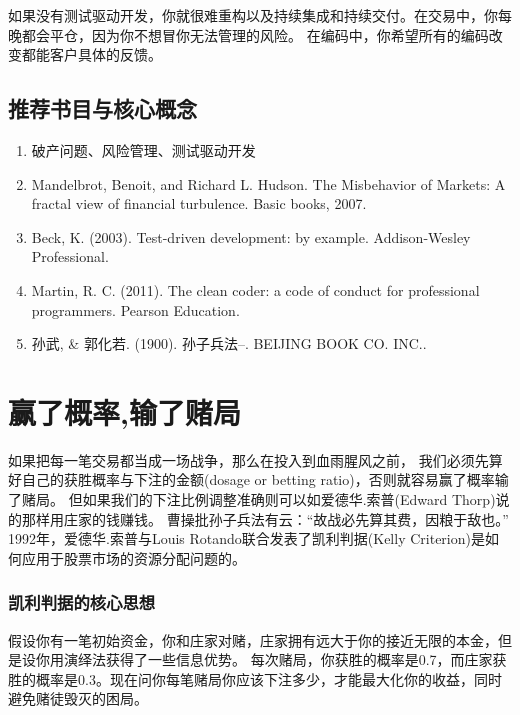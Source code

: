 \documentclass[
  oneside]{book}
\providecommand{\tightlist}{%
  \setlength{\itemsep}{0pt}\setlength{\parskip}{0pt}}
\begin{document}
如果没有测试驱动开发，你就很难重构以及持续集成和持续交付。在交易中，你每晚都会平仓，因为你不想冒你无法管理的风险。
在编码中，你希望所有的编码改变都能客户具体的反馈。

\hypertarget{ux63a8ux8350ux4e66ux76eeux4e0eux6838ux5fc3ux6982ux5ff5}{%
\section{推荐书目与核心概念}\label{ux63a8ux8350ux4e66ux76eeux4e0eux6838ux5fc3ux6982ux5ff5}}

\begin{enumerate}
\def\labelenumi{\arabic{enumi}.}
\tightlist
\item
  破产问题、风险管理、测试驱动开发
\item
  Mandelbrot, Benoit, and Richard L. Hudson. The Misbehavior of Markets: A fractal view of financial turbulence. Basic books, 2007.
\item
  Beck, K. (2003). Test-driven development: by example. Addison-Wesley Professional.
\item
  Martin, R. C. (2011). The clean coder: a code of conduct for professional programmers. Pearson Education.
\item
  孙武, \& 郭化若. (1900). 孙子兵法--. BEIJING BOOK CO. INC..
\end{enumerate}

\hypertarget{ux8d62ux4e86ux6982ux7387ux8f93ux4e86ux8d4cux5c40}{%
\chapter{赢了概率,输了赌局}\label{ux8d62ux4e86ux6982ux7387ux8f93ux4e86ux8d4cux5c40}}

如果把每一笔交易都当成一场战争，那么在投入到血雨腥风之前，
我们必须先算好自己的获胜概率与下注的金额(dosage or betting ratio)，否则就容易赢了概率输了赌局。
但如果我们的下注比例调整准确则可以如爱德华.索普(Edward Thorp)说的那样用庄家的钱赚钱。
曹操批孙子兵法有云：``故战必先算其费，因粮于敌也。''
1992年，爱德华.索普与Louis Rotando联合发表了凯利判据(Kelly Criterion)是如何应用于股票市场的资源分配问题的。

\hypertarget{ux51efux5229ux5224ux636eux7684ux6838ux5fc3ux601dux60f3}{%
\subsection{凯利判据的核心思想}\label{ux51efux5229ux5224ux636eux7684ux6838ux5fc3ux601dux60f3}}

假设你有一笔初始资金，你和庄家对赌，庄家拥有远大于你的接近无限的本金，但是设你用演绎法获得了一些信息优势。
每次赌局，你获胜的概率是0.7，而庄家获胜的概率是0.3。现在问你每笔赌局你应该下注多少，才能最大化你的收益，同时避免赌徒毁灭的困局。
\end{document}
